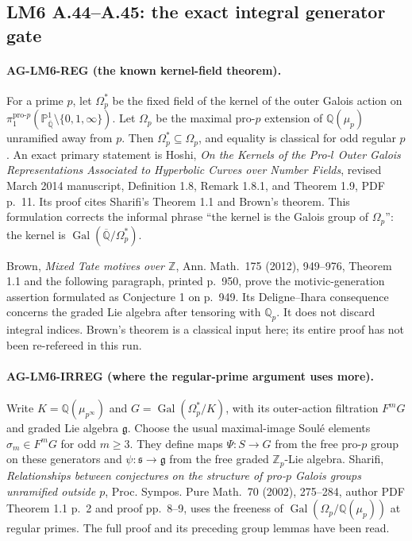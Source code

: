 \subsection{LM6 A.44--A.45: the exact integral generator gate}
\label{ag:lm6}

\paragraph{AG-LM6-REG (the known kernel-field theorem).}
For a prime $p$, let $\Omega_p^*$ be the fixed field of the kernel
of the outer Galois action on
$\pi_1^{\mathrm{pro}\text{-}p}
(\mathbb P^1_{\overline{\mathbb Q}}\setminus\{0,1,\infty\})$.
Let $\Omega_p$ be the maximal pro-$p$ extension of
$\mathbb Q(\mu_p)$ unramified away from $p$. Then
$\Omega_p^*\subseteq\Omega_p$, and equality is classical for odd
regular $p$. An exact primary statement is Hoshi,
\emph{On the Kernels of the Pro-$l$ Outer Galois Representations
Associated to Hyperbolic Curves over Number Fields}, revised March
2014 manuscript, Definition 1.8, Remark 1.8.1, and Theorem 1.9,
PDF p.~11. Its proof cites Sharifi's Theorem 1.1 and Brown's theorem.
This formulation corrects the informal phrase ``the kernel is the
Galois group of $\Omega_p$'': the kernel is
$\operatorname{Gal}(\overline{\mathbb Q}/\Omega_p^*)$.

Brown, \emph{Mixed Tate motives over $\mathbb Z$}, Ann. Math.~175
(2012), 949--976, Theorem 1.1 and the following paragraph, printed
p.~950, prove the motivic-generation assertion formulated as
Conjecture 1 on p.~949. Its Deligne--Ihara consequence concerns the
graded Lie algebra after tensoring with $\mathbb Q_p$. It does not
discard integral indices. Brown's theorem is a classical input here;
its entire proof has not been re-refereed in this run.

\paragraph{AG-LM6-IRREG (where the regular-prime argument uses more).}
Write $K=\mathbb Q(\mu_{p^\infty})$ and
$G=\operatorname{Gal}(\Omega_p^*/K)$, with its outer-action
filtration $F^mG$ and graded Lie algebra $\mathfrak g$.
Choose the usual maximal-image Soulé elements $\sigma_m\in F^mG$
for odd $m\ge3$. They define maps $\Psi:S\to G$ from the free
pro-$p$ group on these generators and
$\psi:\mathfrak s\to\mathfrak g$ from the free graded
$\mathbb Z_p$-Lie algebra. Sharifi,
\emph{Relationships between conjectures on the structure of pro-$p$
Galois groups unramified outside $p$}, Proc. Sympos. Pure Math.~70
(2002), 275--284, author PDF Theorem 1.1 p.~2 and proof pp.~8--9,
uses the freeness of
$\operatorname{Gal}(\Omega_p/\mathbb Q(\mu_p))$ at regular primes.
The full proof and its preceding group lemmas have been read.

